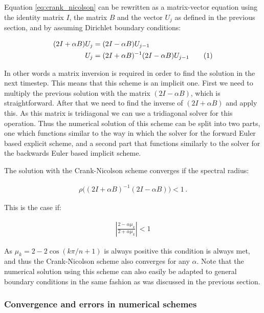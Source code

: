 \documentclass[reprint,english,notitlepage]{revtex4-1}  %
\newcommand\numberthis{\addtocounter{equation}{1}\tag{\theequation}}
\begin{document}
Equation \eqref{eq:crank_nicolson} can be rewritten as a matrix-vector equation using the identity matrix $I$, the matrix $B$ and the vector $U_j$ as defined in the previous section, and by assuming Dirichlet boundary conditions:

\begin{align*}
(2I + \alpha B ) U_j &= (2I - \alpha B) U_{j-1} \\
U_j &= (2I + \alpha B)^{-1} (2I - \alpha B) U_{j-1} \numberthis \label{eq:crank_nicolson_matrix}
\end{align*}

In other words a matrix inversion is required in order to find the solution in the next timestep. This means that this scheme is an implicit one. First we need to multiply the previous solution with the matrix $(2I - \alpha B)$, which is straightforward. After that we need to find the inverse of $(2I + \alpha B)$ and apply this. As this matrix is tridiagonal we can use a tridiagonal solver for this operation. Thus the numerical solution of this scheme can be split into two parts, one which functions similar to the way in which the solver for the forward Euler based explicit scheme, and a second part that functions similarly to the solver for the backwards Euler based implicit scheme.

The solution with the Crank-Nicolson scheme converges if the spectral radius:

\begin{align*}
\rho\bigg( (2I + \alpha B)^{-1} (2I - \alpha B) \bigg) < 1 \, .
\end{align*}

This is the case if:

\begin{align*}
| \frac{2 - \alpha \mu_k}{2 + \alpha \mu_k} | < 1
\end{align*}

As $\mu_k = 2 - 2 \cos(k\pi/n + 1)$ is always positive this condition is always met, and thus the Crank-Nicolson scheme also converges for any $\alpha$. Note that the numerical solution using this scheme can also easily be adapted to general boundary conditions in the same fashion as was discussed in the previous section.

\subsubsection{Convergence and errors in numerical schemes} \label{sec:formalism_1D_diff_eq_numerical_conv_and_err}
\end{document}
